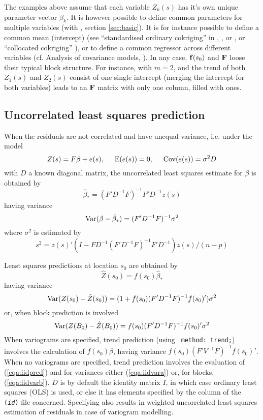 \documentclass[a4paper,12pt]{book}
\renewcommand{\cite}{\citet}
\newcommand{\E}{{\rm E}}       %
\newcommand{\Var}{{\rm Var}}   %
\newcommand{\Cov}{{\rm Cov}}   %
\newcommand{\code}[1]{\texttt{#1}}
\newcommand{\iskey}[1]{\htmlref{\code{{#1}}}{key:#1}}
\newcommand{\hsp}{\hspace{.5cm}}
\begin{document}
The examples above assume that each variable $Z_k (s)$ has it's
own unique parameter vector $\beta_k$. It is however possible to
define common parameters for multiple variables (with
\iskey{merge}, section \ref{sec:basic}). It is for instance
possible to define a common mean (intercept) (see ``standardised ordinary
cokriging'' in \cite[p. 70]{deutsch92}, \cite[p. 409--416]{isaaks},
or \cite[p. 323]{goovaerts97}, or ``collocated cokriging''
\cite[p. 326]{goovaerts97}), or to define a common regressor across
different variables (cf. Analysis of covariance models, \cite[p. 193
and excercise 9.1]{christensen96}). In any case, ${\bf f} (s_0 )$ and
${\bf F}$ loose their typical block structure. For instance, with $m =
2$, and the trend of both $Z_1 (s)$ and $Z_2 (s)$ consist of one single
intercept (merging the intercept for both variables) leads to an ${\bf
F}$ matrix with only one column, filled with ones.


\subsection*{Uncorrelated least squares prediction}

When the residuals are not correlated and have unequal variance, i.e. under
the model
$$ Z(s) = F \beta + e(s), \hsp \E(e(s))= 0, \hsp \Cov(e(s)) = \sigma^2 D $$
with $D$ a known diagonal matrix,
the uncorrelated least squares estimate for $\beta$ is obtained by
$$\hat{\beta}_* = (F'D^{-1} F)^{-1} F'D^{-1}z(s)$$
having variance
$$\Var(\beta - \hat{\beta}_{*} ) = (F'D^{-1} F)^{-1} \sigma^2$$
where $\sigma^2$ is estimated by
$$ s^2 = z(s)'(I-F D^{-1} (F'D^{-1} F)^{-1} F'D^{-1})z(s)/(n-p) $$

Least squares predictions at location $s_0$ are obtained by
\begin{equation}
\hat Z (s_0 ) = f(s_0 ) \hat{\beta}_{*}
\label{eqa:iidpred}
\end{equation}
having variance
\begin{equation}
\Var(Z (s_0 ) - \hat Z (s_0 )) =
(1 + f(s_0 )(F'D^{-1} F)^{-1} f(s_0 )') \sigma^{2}
\label{eqa:iidvara}
\end{equation}
or, when block prediction is involved
\begin{equation}
\Var(Z (B_0 ) - \hat Z (B_0 )) =
f(s_0 )(F'D^{-1} F)^{-1} f(s_0 )' \sigma^2
\label{eqa:iidvarb}
\end{equation}
When variograms are specified, trend prediction (using {\tt
method: trend;}) involves the calculation of $f(s_0 ) \hat \beta$,
having variance $f (s_0 )(F'V^{-1} F)^{-1} f(s_0 )'$. When no
variograms are specified, trend prediction involves the evaluation of
(\ref{eqa:iidpred}) and for variances either (\ref{eqa:iidvara}) or, for
blocks, (\ref{eqa:iidvarb}). $D$ is by default the identity matrix $I$,
in which case ordinary least squares (OLS) is used, 
or else it has elements specified by the \iskey{V} column of the {\tt
\iskey{data}({\em id})} file concerned. Specifying \iskey{V} also results
in weighted uncorrelated least squares estimation of residuals in case
of variogram modelling.
\end{document}
